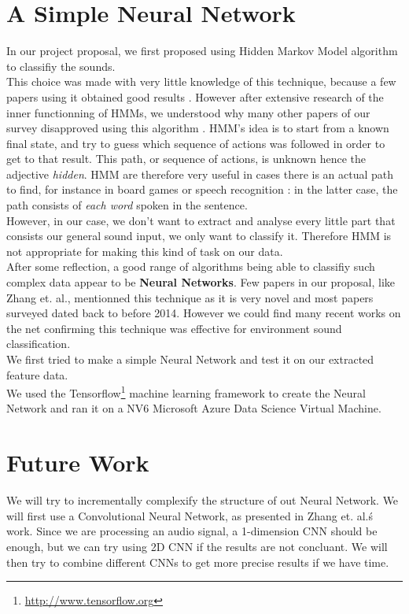 \documentclass{article} %
\begin{document}
\section{A Simple Neural Network}
		In our project proposal, we first proposed using Hidden Markov Model algorithm to classifiy the sounds.\\
		This choice was made with very little knowledge of this technique, because a few papers using it obtained good results \cite{cite3} \cite{cite4}. However after extensive research of the inner functionning of HMMs, we understood why many other papers of our survey disapproved using this algorithm \cite{cite5} \cite{cite6}. HMM's idea is to start from a known final state, and try to guess which sequence of actions was followed in order to get to that result. This path, or sequence of actions, is unknown hence the adjective \emph{hidden}. HMM are therefore very useful in cases there is an actual path to find, for instance in board games or speech recognition : in the latter case, the path consists of \emph{each word} spoken in the sentence.\\
		\newline
		However, in our case, we don't want to extract and analyse every little part that consists our general sound input, we only want to classify it. Therefore HMM is not appropriate for making this kind of task on our data.\\
		\newline
		After some reflection, a good range of algorithms being able to classifiy such complex data appear to be \textbf{Neural Networks}. Few papers in our proposal, like Zhang et. al.\cite{cite6}, mentionned this technique as it is very novel and most papers surveyed dated back to before 2014. However we could find many recent works on the net confirming this technique was effective for environment sound classification.\\
		We first tried to make a simple Neural Network and test it on our extracted feature data.\\

		We used the Tensorflow\footnote{\url{http://www.tensorflow.org}} machine learning framework to create the Neural Network and ran it on a NV6 Microsoft Azure Data Science Virtual Machine.

\section{Future Work}
	We will try to incrementally complexify the structure of out Neural Network. We will first use a Convolutional Neural Network, as presented in Zhang et. al.\'s work\cite{cite6}. Since we are processing an audio signal, a 1-dimension CNN should be enough, but we can try using 2D CNN if the results are not concluant. We will then try to combine different CNNs to get more precise results if we have time.
\end{document}
